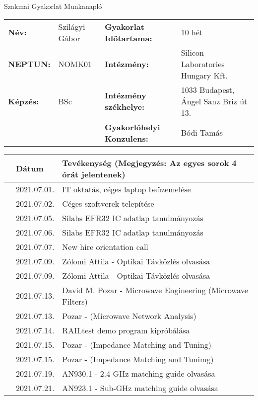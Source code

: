 \documentclass[9pt,a4paper,oneside]{report}
\newcounter{magicrownumbers}
\newcommand\rownum{\stepcounter{magicrownumbers}\arabic{magicrownumbers}}
\begin{document}
\begin{center}
	\Large{Szakmai Gyakorlat Munkanapló}
\end{center}
\begin{tabular}{p{2.5 cm} p{2.5 cm} p{5 cm} p{6 cm}}
	\textbf{Név:} & Szilágyi Gábor & \textbf{Gyakorlat Időtartama:} & 10 hét\\
	\textbf{NEPTUN:} & NOMK01 & \textbf{Intézmény:} & Silicon Laboratories Hungary Kft.\\
	\textbf{Képzés:} & BSc & \textbf{Intézmény székhelye:} & 1033 Budapest, Ángel Sanz Briz út 13. \\
	& & \textbf{Gyakorlóhelyi Konzulens:} & Bódi Tamás
\end{tabular}
\begin{table}[h!]
	\centering
	\begin{tabular}{| c | p{3 cm} | p{10 cm} |}
	\hline
	 & Dátum & Tevékenység (Megjegyzés: Az egyes sorok 4 órát jelentenek) \\ \hline \hline
	\rownum & 2021.07.01. & IT oktatás, céges laptop beüzemelése \\ \hline
	\rownum & 2021.07.02. & Céges szoftverek telepítése \\ \hline
	\rownum & 2021.07.05. & Silabs EFR32 IC adatlap tanulmányozás \\ \hline
	\rownum & 2021.07.06. & Silabs EFR32 IC adatlap tanulmányozás \\ \hline
	\rownum & 2021.07.07. & New hire orientation call \\ \hline
	\rownum & 2021.07.09. & Zólomi Attila - Optikai Távközlés olvasása \\ \hline
	\rownum & 2021.07.09. & Zólomi Attila - Optikai Távközlés olvasása \\ \hline
	\rownum & 2021.07.13. & David M. Pozar - Microwave Engineering (Microwave Filters) \\ \hline
	\rownum & 2021.07.13. & Pozar - (Microwave Network Analysis) \\ \hline
	\rownum & 2021.07.14. & RAILtest demo program kipróbálása \\ \hline
	\rownum & 2021.07.15. & Pozar - (Impedance Matching and Tuning) \\ \hline
	\rownum & 2021.07.15. & Pozar - (Impedance Matching and Tunimg) \\ \hline
	\rownum & 2021.07.19. & AN930.1 - 2.4 GHz matching guide olvasása \\ \hline
	\rownum & 2021.07.21. & AN923.1 - Sub-GHz matching guide olvasása \\ \hline

\end{tabular}
\end{table}
\end{document}
